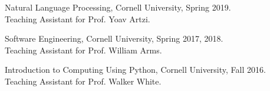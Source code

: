 \noindent Natural Language Processing, Cornell University, Spring 2019. \\
\indent Teaching Assistant for Prof. Yoav Artzi. 

\noindent Software Engineering, Cornell University, Spring 2017, 2018. \\
\indent Teaching Assistant for Prof. William Arms.

\noindent Introduction to Computing Using Python, Cornell University, Fall 2016. \\
\indent Teaching Assistant for Prof. Walker White. \\



